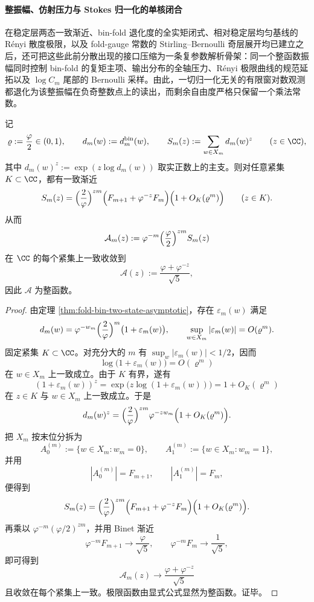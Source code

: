 \paragraph{整振幅、仿射压力与 Stokes 归一化的单核闭合}
在稳定层两态一致渐近、bin-fold 退化度的全实矩闭式、相对稳定层均匀基线的 Rényi 散度极限，以及 fold-gauge 常数的 Stirling--Bernoulli 奇层展开均已建立之后，还可把这些此前分散出现的接口压缩为一条复参数解析骨架：同一个整函数振幅同时控制 bin-fold 的复矩主项、输出分布的全轴压力、Rényi 极限曲线的规范延拓以及 \(\log C_m\) 尾部的 Bernoulli 采样。由此，一切归一化无关的有限窗对数观测都退化为该整振幅在负奇整数点上的读出，而剩余自由度严格只保留一个乘法常数。

\begin{theorem}\label{thm:xi-time-part70e-binfold-entire-amplitude-law}
记
\[
\varrho:=\frac{\varphi}{2}\in(0,1),
\qquad
d_m(w):=d_m^{\mathrm{bin}}(w),
\qquad
S_m(z):=\sum_{w\in X_m} d_m(w)^z
\qquad (z\in\CC),
\]
其中 \(d_m(w)^z:=\exp(z\log d_m(w))\) 取实正数上的主支。则对任意紧集 \(K\subset\CC\)，都有一致渐近
\[
S_m(z)
=
\Bigl(\frac{2}{\varphi}\Bigr)^{zm}
\Bigl(F_{m+1}+\varphi^{-z}F_m\Bigr)
\Bigl(1+O_K(\varrho^m)\Bigr)
\qquad (z\in K).
\]
从而
\[
\mathcal A_m(z):=
\varphi^{-m}\Bigl(\frac{\varphi}{2}\Bigr)^{zm}S_m(z)
\]
在 \(\CC\) 的每个紧集上一致收敛到
\[
\mathcal A(z):=\frac{\varphi+\varphi^{-z}}{\sqrt5},
\]
因此 \(\mathcal A\) 为整函数。
\end{theorem}
\begin{proof}
由定理 \ref{thm:fold-bin-two-state-asymptotic}，存在 \(\varepsilon_m(w)\) 满足
\[
d_m(w)=\varphi^{-w_m}\Bigl(\frac{2}{\varphi}\Bigr)^m\bigl(1+\varepsilon_m(w)\bigr),
\qquad
\sup_{w\in X_m}|\varepsilon_m(w)|=O(\varrho^m).
\]
固定紧集 \(K\subset\CC\)。对充分大的 \(m\) 有 \(\sup_{w}|\varepsilon_m(w)|<1/2\)，因而
\[
\log\bigl(1+\varepsilon_m(w)\bigr)=O(\varrho^m)
\]
在 \(w\in X_m\) 上一致成立。由于 \(K\) 有界，遂有
\[
(1+\varepsilon_m(w))^z
=
\exp\!\bigl(z\log(1+\varepsilon_m(w))\bigr)
=
1+O_K(\varrho^m)
\]
在 \(z\in K\) 与 \(w\in X_m\) 上一致成立。于是
\[
d_m(w)^z
=
\Bigl(\frac{2}{\varphi}\Bigr)^{zm}\varphi^{-zw_m}
\Bigl(1+O_K(\varrho^m)\Bigr).
\]
把 \(X_m\) 按末位分拆为
\[
A_0^{(m)}:=\{w\in X_m:w_m=0\},
\qquad
A_1^{(m)}:=\{w\in X_m:w_m=1\},
\]
并用
\[
|A_0^{(m)}|=F_{m+1},
\qquad
|A_1^{(m)}|=F_m,
\]
便得到
\[
S_m(z)
=
\Bigl(\frac{2}{\varphi}\Bigr)^{zm}
\Bigl(F_{m+1}+\varphi^{-z}F_m\Bigr)
\Bigl(1+O_K(\varrho^m)\Bigr).
\]
再乘以 \(\varphi^{-m}(\varphi/2)^{zm}\)，并用 Binet 渐近
\[
\varphi^{-m}F_{m+1}\to \frac{\varphi}{\sqrt5},
\qquad
\varphi^{-m}F_m\to \frac{1}{\sqrt5},
\]
即可得到
\[
\mathcal A_m(z)\to \frac{\varphi+\varphi^{-z}}{\sqrt5}
\]
且收敛在每个紧集上一致。极限函数由显式公式显然为整函数。证毕。
\end{proof}

